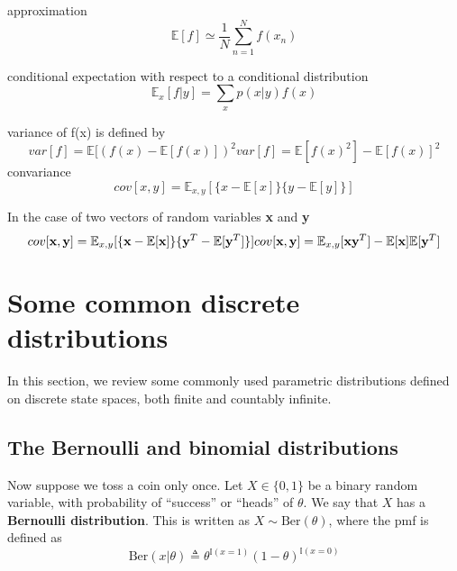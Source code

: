 approximation
\begin{equation}
\mathbb{E}[f] \simeq \frac{1}{N}\sum_{n=1}^{N}{f(x_n)}
\end{equation}
                                  
conditional expectation with respect to a conditional distribution                                
\begin{equation}
\mathbb{E}_x[f|y] = \sum_{x}p(x|y)f(x)
\end{equation}

variance of f(x) is defined by
\begin{equation}
var[f] = \mathbb{E}[(f(x) - \mathbb{E}[f(x)])^2
var[f] = \mathbb{E}[f(x)^2]-\mathbb{E}[f(x)]^2
\end{equation}
convariance 
\begin{equation}
cov[x,y] = \mathbb{E}_{x,y}[\{x- \mathbb{E}[x]\}\{y-\mathbb{E}[y]\}]
\end{equation}

In the case of two vectors of random variables \textbf{x} and \textbf{y}
\begin{equation}
cov[\textbf{x},\textbf{y}] = \mathbb{E}_{x,y}[\{\textbf{x}-\mathbb{E}[\textbf{x}]\} \{ \textbf{y}^T - \mathbb{E}[\textbf{y}^T ]\}] \\
cov[\textbf{x},\textbf{y}] = \mathbb{E}_{x,y}[\textbf{x}\textbf{y}^T] - \mathbb{E}[\textbf{x}] \mathbb{E}[\textbf{y}^T]
\end{equation}

\section{Some common discrete distributions}
In this section, we review some commonly used parametric distributions defined on discrete state spaces, both finite and countably infinite.


\subsection{The Bernoulli and binomial distributions}

\begin{definition}
Now suppose we toss a coin only once. Let $X \in \{0,1\}$ be a binary random variable, with probability of “success” or “heads” of $\theta$. We say that $X$ has a \textbf{Bernoulli distribution}. This is written as $X \sim \text{Ber}(\theta)$, where the pmf is defined as 
\begin{equation}
\text{Ber}(x|\theta) \triangleq \theta^{\mathbb{I}(x=1)}(1-\theta)^{\mathbb{I}(x=0)}
\end{equation}
\end{definition}


